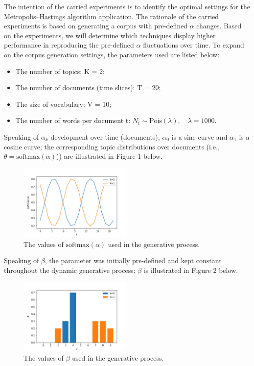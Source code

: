 \documentclass[12pt]{article}
\begin{document}
\par The intention of the carried experiments is to identify the optimal settings for the Metropolis--Hastings algorithm application. 
The rationale of the carried experiments is based on generating a corpus with pre-defined $\alpha$ changes. Based on the experiments, we will determine which techniques display higher performance in reproducing the pre-defined $\alpha$ fluctuations over time. To expand on the corpus generation settings, the parameters used are listed below:
\begin{itemize}
  \item The number of topics: K = 2;
  \item The number of documents (time slices): T = 20;
  \item The size of vocabulary: V = 10;
  \item The number of words per document t: $N_t \sim \mbox{Pois}(\lambda),\quad \lambda = 1000$.
\end{itemize}
Speaking of $\alpha_k$ development over time (documents), $\alpha_0$ is a sine curve and $\alpha_1$ is a cosine curve; the corresponding topic distributions over documents (i.e., $\theta = \mbox{softmax}(\alpha)$)) are illustrated in Figure 1 below.
\begin{figure}[H]
  \centering
  \includegraphics[width=0.5\textwidth]{theta_initial}
  \caption{The values of $\mbox{softmax}(\alpha)$ used in the generative process.}
\end{figure}
Speaking of $\beta$, the parameter was initially pre-defined and kept constant throughout the dynamic generative process; $\beta$ is illustrated in Figure 2 below.
\begin{figure}[H]
  \centering
  \includegraphics[width=0.5\textwidth]{beta_initial}
  \caption{The values of $\beta$ used in the generative process.}
\end{figure}
\end{document}
